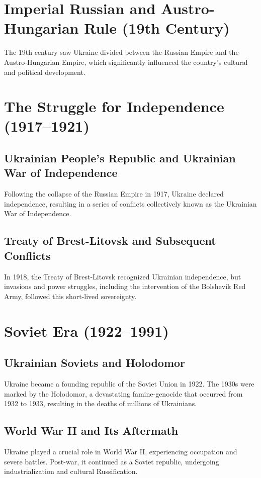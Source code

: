 \documentclass{book}
\begin{document}
\section{Imperial Russian and Austro-Hungarian Rule (19th Century)}
\label{sec:imperial-russian-austro-hungarian-rule}
The 19th century saw Ukraine divided between the Russian Empire and the Austro-Hungarian Empire, which significantly influenced the country's cultural and political development.

\section{The Struggle for Independence (1917–1921)}
\label{sec:struggle-for-independence}
\subsection{Ukrainian People's Republic and Ukrainian War of Independence}
Following the collapse of the Russian Empire in 1917, Ukraine declared independence, resulting in a series of conflicts collectively known as the Ukrainian War of Independence.

\subsection{Treaty of Brest-Litovsk and Subsequent Conflicts}
In 1918, the Treaty of Brest-Litovsk recognized Ukrainian independence, but invasions and power struggles, including the intervention of the Bolshevik Red Army, followed this short-lived sovereignty.

\section{Soviet Era (1922–1991)}
\label{sec:soviet-era}
\subsection{Ukrainian Soviets and Holodomor}
Ukraine became a founding republic of the Soviet Union in 1922. The 1930s were marked by the Holodomor, a devastating famine-genocide that occurred from 1932 to 1933, resulting in the deaths of millions of Ukrainians.

\subsection{World War II and Its Aftermath}
Ukraine played a crucial role in World War II, experiencing occupation and severe battles. Post-war, it continued as a Soviet republic, undergoing industrialization and cultural Russification.
\end{document}
